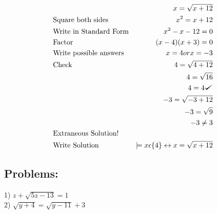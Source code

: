 \documentclass{book}
\theoremstyle{definition}
\def\checkmark{\tikz\fill[scale=0.4](0,.35) -- (.25,0) -- (1,.7) -- (.25,.15) -- cycle;}
\begin{document}
\begin{equation}
\begin{align*}
\label{(9.1)}
&                            &x=\sqrt{x+12} \\
&\text{Square both sides}            &x^2=x+12 \\
&\text{Write in Standard Form}       &x^2-x-12=0 \\
&\text{Factor}                    &(x-4)(x+3)=0 \\
&\text{Write possible answers}        &x=4 or x=-3 \\
&\text{Check}                    &4=\sqrt{4+12} \\
&                    &4=\sqrt{16} \\
&                    &4=4 \checkmark{} \\ 
&                    &-3=\sqrt{-3+12} \\
&                    &-3=\sqrt{9} \\
&                    &-3\neq3 \\             &\text{Extraneous Solution!}\\
&\text{Write Solution}    &\models x\epsilon\{4\} \leftrightarrow x=\sqrt{x+12}
\end{align*}
\end{equation}

\subsection{Problems:}
\vspace{3mm}
1) $z+\sqrt{5z-13}=1$\\
2) $\sqrt{y+4}=\sqrt{y-11}+3$
\end{document}
